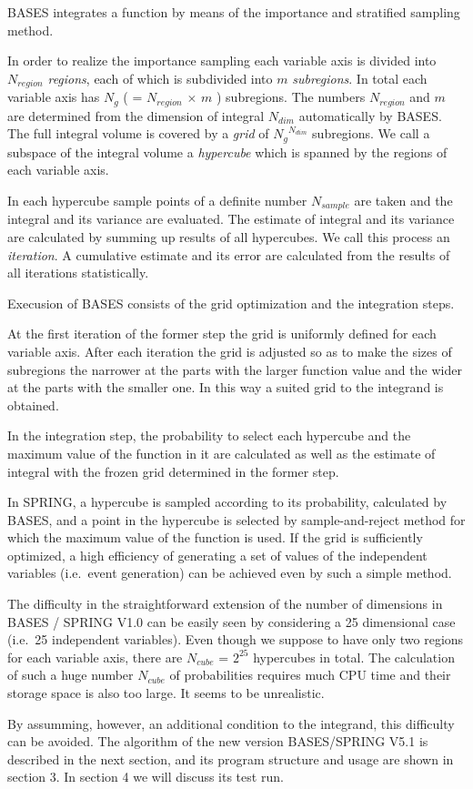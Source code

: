 {\small BASES} integrates a function by means of the importance and stratified 
sampling method. 
\par\noindent
In order to realize the importance sampling each variable axis is divided into
$N_{region}$ {\it regions}, each of which is subdivided into $m$ {\it subregions}.
In total each variable axis has $N_g$ ( = $N_{region}$ $\times$ $m$ ) subregions. 
The numbers $N_{region}$ and $m$ are determined from the dimension of integral $N_{dim}$
automatically by {\small BASES}.
The full integral volume is covered by a {\it grid} of ${N_g}^{N_{dim}}$
subregions. 
We call a subspace of the
integral volume a {\it hypercube} which is spanned by the regions of each variable axis.
\par
In each hypercube sample points of a definite number $N_{sample}$ are taken and
the integral and its variance are evaluated.
The estimate of integral and its variance are calculated by summing up results of all
hypercubes. 
We call this process an {\it iteration}.
A cumulative estimate and its error are calculated from the results of all
iterations statistically.
\par
Execusion of {\small BASES} consists of the grid optimization and the integration
steps.
\par\noindent
At the first iteration of the former step the grid is uniformly defined for each
variable axis.   After each iteration the grid is adjusted so as to make the sizes of
subregions the narrower at the parts with the larger function value and the wider at
the parts with the smaller one. In this way a suited grid to the integrand is
obtained.  
\par\noindent
In the integration step, the probability to select each hypercube and
the maximum value of the function in it are calculated as well as the estimate of
integral with the frozen grid determined in the former step.
\par\noindent
In {\small SPRING}, a hypercube is sampled according to its probability,
calculated by {\small BASES}, and a point in the hypercube is selected by
sample-and-reject method for which the maximum value of the function is used.
If the grid is sufficiently optimized,  a high efficiency of generating
a set of values of the independent variables (i.e.~event generation) can be
achieved even by such a simple method.
\par
The difficulty in the straightforward extension of the number of dimensions in {\small
BASES / SPRING V1.0} can be easily seen by considering a 25 dimensional case
(i.e.~25 independent variables). 
Even though we suppose to have only two regions for each variable
axis, there are $N_{cube}$ = $2^{25}$ hypercubes in total. 
The calculation of such
a huge number $N_{cube}$ of probabilities requires much {\small CPU} time and their
storage space is also too large. 
It seems to be unrealistic.
\par
By assumming, however, an additional condition to the integrand,
this difficulty can be avoided. 
The algorithm of the new version {\small BASES/SPRING
V5.1} is described in the next section, and its program structure and usage are
shown in section 3. In section 4 we will discuss its test run.